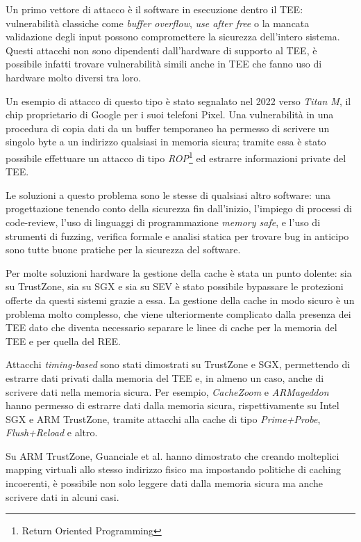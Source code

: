 \documentclass[12pt,italian]{report}
\begin{document}
\medbreak
Un primo vettore di attacco è il software in esecuzione dentro il TEE:
vulnerabilità classiche come \textit{buffer overflow}, \textit{use after free}
o la mancata validazione degli input possono compromettere la sicurezza
dell'intero sistema.
Questi attacchi non sono dipendenti dall'hardware di supporto al TEE,
è possibile infatti trovare vulnerabilità simili anche in TEE che fanno
uso di hardware molto diversi tra loro.

Un esempio di attacco di questo tipo è stato segnalato nel 2022 verso
\textit{Titan M}\cite{attack_titanM}, il chip proprietario di Google
per i suoi telefoni Pixel.
Una vulnerabilità in una procedura di copia dati da un buffer temporaneo
ha permesso di scrivere un singolo byte a un indirizzo qualsiasi in memoria
sicura; tramite essa è stato possibile effettuare un attacco
di tipo \textit{ROP}\footnote{Return Oriented Programming}
ed estrarre informazioni private del TEE.

Le soluzioni a questo problema sono le stesse di qualsiasi altro software:
una progettazione tenendo conto della sicurezza fin dall'inizio, 
l'impiego di processi di code-review, l'uso di linguaggi di programmazione
\textit{memory safe}, e l'uso di strumenti di fuzzing, verifica formale e
analisi statica per trovare bug in anticipo sono tutte buone pratiche per
la sicurezza del software.  

\bigbreak \noindent
Per molte soluzioni hardware la gestione della cache è stata
un punto dolente: sia su TrustZone, sia su SGX e sia su SEV
è stato possibile bypassare le protezioni offerte da questi sistemi
grazie a essa.
La gestione della cache in modo sicuro è un problema molto complesso,
che viene ulteriormente complicato dalla presenza dei TEE dato che
diventa necessario separare le linee di cache per la memoria del TEE
e per quella del REE.

Attacchi \textit{timing-based} sono stati dimostrati su TrustZone e SGX,
permettendo di estrarre dati privati dalla memoria del TEE e, in almeno
un caso, anche di scrivere dati nella memoria sicura.
Per esempio, \textit{CacheZoom}\cite{cachezoom} e
\textit{ARMageddon}\cite{armageddon} hanno permesso di estrarre dati
dalla memoria sicura, rispettivamente su Intel SGX e ARM TrustZone,
tramite attacchi alla cache di tipo \textit{Prime+Probe},
\textit{Flush+Reload} e altro.

Su ARM TrustZone, Guanciale et al.\cite{aliasdriven} hanno dimostrato
che creando molteplici mapping virtuali allo stesso indirizzo fisico
ma impostando politiche di caching incoerenti, è possibile non solo
leggere dati dalla memoria sicura ma anche scrivere dati in alcuni casi.
\end{document}
